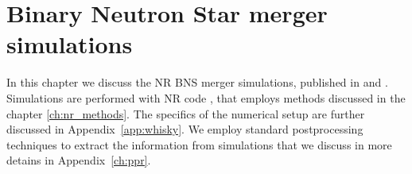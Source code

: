 \chapter{Binary Neutron Star merger simulations} \label{ch:bns_sims}

In this chapter we discuss the \ac{NR} \ac{BNS} merger simulations,
published in \citet{Nedora:2019jhl} and \citet{Nedora:2020pak}.
%
Simulations are performed with \ac{NR} code \wisky{}, that employs 
methods discussed in the chapter \ref{ch:nr_methods}. The specifics 
of the numerical setup are further discussed in Appendix~\ref{app:whisky}.
%
We employ standard postprocessing techniques to extract the information 
from simulations that we discuss in more detains in Appendix~\ref{ch:ppr}.
%












